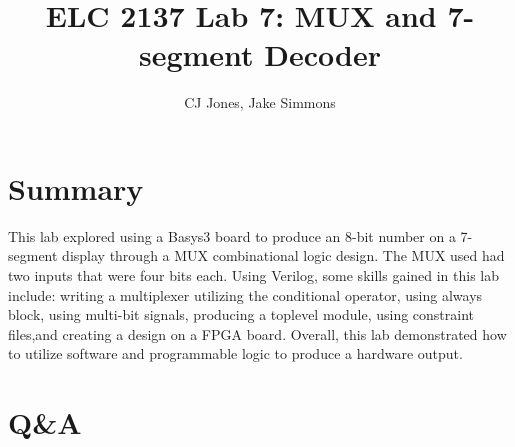 \documentclass[11pt]{article}
\begin{document}
\title{ELC 2137 Lab 7: MUX and 7-segment Decoder}
\author{CJ Jones, Jake Simmons}

\maketitle


\section*{Summary}

This lab explored using a Basys3 board to produce an 8-bit number on a 7-segment display through a MUX combinational logic design. The MUX used had two inputs that were four bits each. Using Verilog, some skills gained in this lab include: writing a multiplexer utilizing the conditional operator, using always block, using multi-bit signals, producing a toplevel module, using constraint files,and creating a design on a FPGA board. Overall, this lab demonstrated how to utilize software and programmable logic to produce a hardware output.


\section*{Q\&A}
\end{document}
